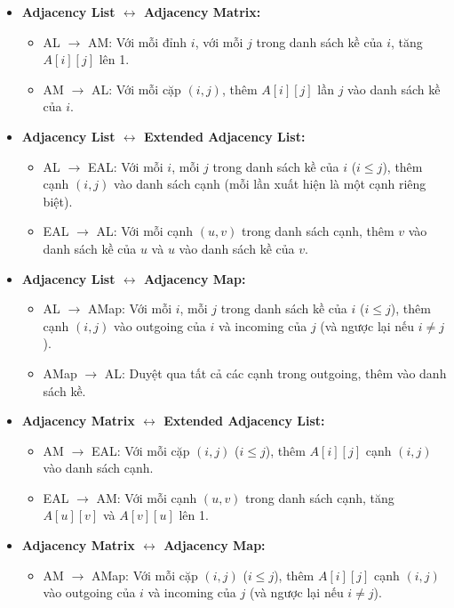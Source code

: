 \documentclass{article}
\begin{document}
\begin{itemize}
    \item \textbf{Adjacency List $\leftrightarrow$ Adjacency Matrix:}
    \begin{itemize}
        \item AL $\to$ AM: Với mỗi đỉnh $i$, với mỗi $j$ trong danh sách kề của $i$, tăng $A[i][j]$ lên 1.
        \item AM $\to$ AL: Với mỗi cặp $(i,j)$, thêm $A[i][j]$ lần $j$ vào danh sách kề của $i$.
    \end{itemize}
    \item \textbf{Adjacency List $\leftrightarrow$ Extended Adjacency List:}
    \begin{itemize}
        \item AL $\to$ EAL: Với mỗi $i$, mỗi $j$ trong danh sách kề của $i$ ($i \leq j$), thêm cạnh $(i,j)$ vào danh sách cạnh (mỗi lần xuất hiện là một cạnh riêng biệt).
        \item EAL $\to$ AL: Với mỗi cạnh $(u,v)$ trong danh sách cạnh, thêm $v$ vào danh sách kề của $u$ và $u$ vào danh sách kề của $v$.
    \end{itemize}
    \item \textbf{Adjacency List $\leftrightarrow$ Adjacency Map:}
    \begin{itemize}
        \item AL $\to$ AMap: Với mỗi $i$, mỗi $j$ trong danh sách kề của $i$ ($i \leq j$), thêm cạnh $(i,j)$ vào outgoing của $i$ và incoming của $j$ (và ngược lại nếu $i \neq j$).
        \item AMap $\to$ AL: Duyệt qua tất cả các cạnh trong outgoing, thêm vào danh sách kề.
    \end{itemize}
    \item \textbf{Adjacency Matrix $\leftrightarrow$ Extended Adjacency List:}
    \begin{itemize}
        \item AM $\to$ EAL: Với mỗi cặp $(i,j)$ ($i \leq j$), thêm $A[i][j]$ cạnh $(i,j)$ vào danh sách cạnh.
        \item EAL $\to$ AM: Với mỗi cạnh $(u,v)$ trong danh sách cạnh, tăng $A[u][v]$ và $A[v][u]$ lên 1.
    \end{itemize}
    \item \textbf{Adjacency Matrix $\leftrightarrow$ Adjacency Map:}
    \begin{itemize}
        \item AM $\to$ AMap: Với mỗi cặp $(i,j)$ ($i \leq j$), thêm $A[i][j]$ cạnh $(i,j)$ vào outgoing của $i$ và incoming của $j$ (và ngược lại nếu $i \neq j$).

\end{itemize}
\end{itemize}
\end{document}
